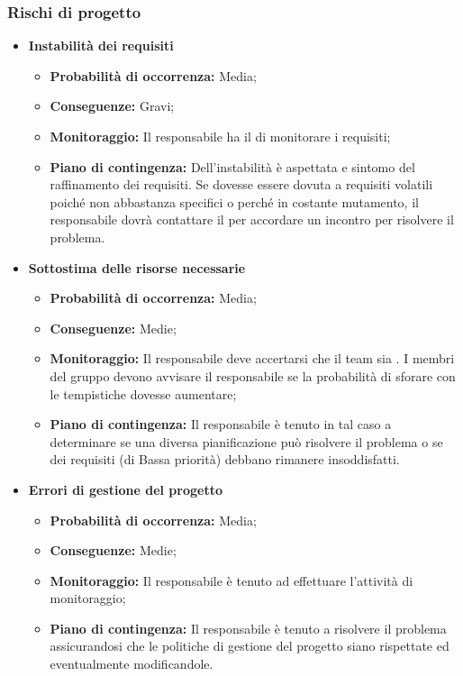 	\subsubsection{Rischi di progetto}
		\begin{itemize}
		\item \textbf{Instabilità dei requisiti}
			\begin{itemize}
				\item \textbf{Probabilità di occorrenza:} Media;
				\item \textbf{Conseguenze:} Gravi;
				\item \textbf{Monitoraggio:} Il responsabile ha il  di monitorare i requisiti;
				\item \textbf{Piano di contingenza:} Dell'instabilità è aspettata e sintomo del raffinamento dei requisiti.	Se dovesse essere dovuta a requisiti volatili poiché non abbastanza specifici o perché in costante mutamento, il responsabile dovrà contattare il  per accordare un incontro per risolvere il problema.
			\end{itemize}
		\item \textbf{Sottostima delle risorse necessarie}
			\begin{itemize}
				\item \textbf{Probabilità di occorrenza:} Media;
				\item \textbf{Conseguenze:} Medie;
				\item \textbf{Monitoraggio:} Il responsabile deve accertarsi che il team sia . I membri del gruppo devono avvisare il responsabile se la probabilità di sforare con le tempistiche dovesse aumentare;
				\item \textbf{Piano di contingenza:} Il responsabile è tenuto in tal caso a determinare se una diversa pianificazione può risolvere il problema o se dei requisiti (di Bassa priorità) debbano rimanere insoddisfatti.
			\end{itemize}
		\item \textbf{Errori di gestione del progetto}
			\begin{itemize}
				\item \textbf{Probabilità di occorrenza:} Media;
				\item \textbf{Conseguenze:} Medie;
				\item \textbf{Monitoraggio:} Il responsabile è tenuto ad effettuare l'attività di monitoraggio;
				\item \textbf{Piano di contingenza:} Il responsabile è tenuto a risolvere il problema assicurandosi che le politiche di gestione del progetto siano rispettate ed eventualmente modificandole.
			\end{itemize}
		\end{itemize}
\pagebreak